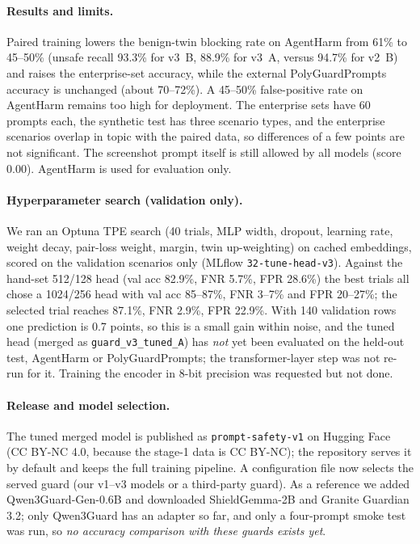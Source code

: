 \documentclass[conference]{IEEEtran}
\begin{document}
\paragraph{Results and limits.} Paired training lowers the benign-twin blocking rate on AgentHarm from 61\% to 45--50\% (unsafe recall 93.3\% for v3~B, 88.9\% for v3~A, versus 94.7\% for v2~B) and raises the enterprise-set accuracy, while the external PolyGuardPrompts accuracy is unchanged (about 70--72\%). A 45--50\% false-positive rate on AgentHarm remains too high for deployment. The enterprise sets have 60 prompts each, the synthetic test has three scenario types, and the enterprise scenarios overlap in topic with the paired data, so differences of a few points are not significant. The screenshot prompt itself is still allowed by all models (score 0.00). AgentHarm is used for evaluation only.

\paragraph{Hyperparameter search (validation only).} We ran an Optuna TPE search (40 trials, MLP width, dropout, learning rate, weight decay, pair-loss weight, margin, twin up-weighting) on cached embeddings, scored on the validation scenarios only (MLflow \texttt{32-tune-head-v3}). Against the hand-set 512/128 head (val acc 82.9\%, FNR 5.7\%, FPR 28.6\%) the best trials all chose a 1024/256 head with val acc 85--87\%, FNR 3--7\% and FPR 20--27\%; the selected trial reaches 87.1\%, FNR 2.9\%, FPR 22.9\%. With 140 validation rows one prediction is 0.7 points, so this is a small gain within noise, and the tuned head (merged as \texttt{guard\_v3\_tuned\_A}) has \emph{not} yet been evaluated on the held-out test, AgentHarm or PolyGuardPrompts; the transformer-layer step was not re-run for it. Training the encoder in 8-bit precision was requested but not done.
\paragraph{Release and model selection.} The tuned merged model is published as \texttt{prompt-safety-v1} on Hugging Face (CC BY-NC 4.0, because the stage-1 data is CC BY-NC); the repository serves it by default and keeps the full training pipeline. A configuration file now selects the served guard (our v1--v3 models or a third-party guard). As a reference we added Qwen3Guard-Gen-0.6B and downloaded ShieldGemma-2B and Granite Guardian 3.2; only Qwen3Guard has an adapter so far, and only a four-prompt smoke test was run, so \emph{no accuracy comparison with these guards exists yet}.
\end{document}
